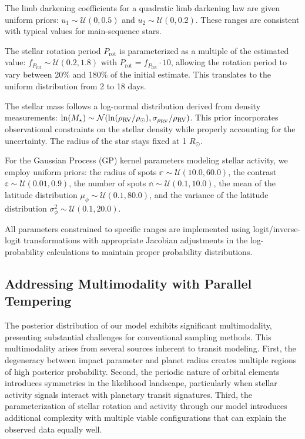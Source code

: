 \documentclass[twocolumn]{aastex631}
\begin{document}
The limb darkening coefficients for a quadratic limb darkening law are given uniform priors: 
$u_1 \sim \mathcal{U}(0, 0.5)$ and $u_2 \sim \mathcal{U}(0, 0.2)$. These ranges are consistent with typical values 
for main-sequence stars.

The stellar rotation period $P_{\text{rot}}$ is parameterized as a multiple of the estimated 
value: $f_{P_{\text{rot}}} \sim \mathcal{U}(0.2, 1.8)$ with $P_{\text{rot}} = f_{P_{\text{rot}}} 
\cdot 10$, allowing the rotation period to vary between 20\% and 180\% of the initial estimate. This translates to the uniform 
distribution from 2 to 18 days.

The stellar mass follows a log-normal distribution derived from density measurements: 
$\ln(M_{\star}) \sim \mathcal{N}(\ln(\rho_{\rm RV} / \rho_{\odot}), \sigma_{\rho_{\rm RV}} / \rho_{\rm RV})$. 
This prior incorporates observational constraints on the stellar density while properly accounting for the uncertainty.
The radius of the star stays fixed at 1 $R_\odot$.

For the Gaussian Process (GP) kernel parameters modeling stellar activity, we employ uniform priors: the radius of spots 
$\mathbb{r} \sim \mathcal{U}(10.0, 60.0)$, the contrast $\mathbb{c} \sim \mathcal{U}(0.01, 0.9)$, 
the number of spots $\mathbb{n} \sim \mathcal{U}(0.1, 10.0)$, the mean of the latitude distribution $\mu_\phi \sim \mathcal{U}(0.1, 80.0)$, 
and the variance of the latitude distribution $\sigma^2_\phi \sim \mathcal{U}(0.1, 20.0)$.

All parameters constrained to specific ranges are implemented using logit/inverse-logit transformations with appropriate 
Jacobian adjustments in the log-probability calculations to maintain proper probability distributions.

\subsection{Addressing Multimodality with Parallel Tempering}

The posterior distribution of our model exhibits significant multimodality, presenting substantial challenges for 
conventional sampling methods. This multimodality arises from several sources inherent to transit modeling. 
First, the degeneracy between impact parameter and planet radius creates multiple regions of high posterior probability. 
Second, the periodic nature of orbital elements introduces symmetries in the likelihood landscape, particularly when stellar 
activity signals interact with planetary transit signatures. Third, the parameterization of stellar rotation and activity through 
our model introduces additional complexity with multiple viable configurations that can explain the observed data equally well.
\end{document}
